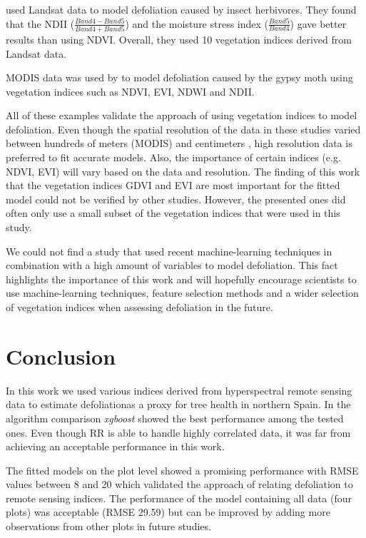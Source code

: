 \documentclass[review]{elsarticle}
\begin{document}
\cite{townsendGeneralLandsatModel2012} used Landsat data to model defoliation caused by insect herbivores.
They found that the \ac{NDII} ($\frac{Band 4 - Band 5}{Band 4 + Band 5}$) and the moisture stress index ($\frac{Band 5}{Band 4}$) gave better results than using NDVI.
Overall, they used 10 vegetation indices derived from Landsat data.

MODIS data was used by \cite{debeursEstimatingEffectGypsy2008} to model defoliation caused by the gypsy moth using vegetation indices such as NDVI, EVI, NDWI and NDII.

All of these examples validate the approach of using vegetation indices to model defoliation.
Even though the spatial resolution of the data in these studies varied between hundreds of meters (MODIS) \cite{debeursEstimatingEffectGypsy2008} and centimeters \cite{goodbodyDigitalAerialPhotogrammetry2018}, high resolution data is preferred to fit accurate models.
Also, the importance of certain indices (e.g. NDVI, EVI) will vary based on the data and resolution.
The finding of this work that the vegetation indices GDVI and EVI are most important for the fitted model could not be verified by other studies.
However, the presented ones did often only use a small subset of the vegetation indices that were used in this study.

We could not find a study that used recent machine-learning techniques in combination with a high amount of variables to model defoliation.
This fact highlights the importance of this work and will hopefully encourage scientists to use machine-learning techniques, feature selection methods and a wider selection of vegetation indices when assessing defoliation in the future.

\section{Conclusion}

\noindent In this work we used various indices derived from hyperspectral remote sensing data to estimate defoliationas a proxy for tree health in northern Spain.
In the algorithm comparison \textit{xgboost} showed the best performance among the tested ones.
Even though \ac{RR} is able to handle highly correlated data, it was far from achieving an acceptable performance in this work.

The fitted models on the plot level showed a promising performance with RMSE values between 8 and 20 which validated the approach of relating defoliation to remote sensing indices.
The performance of the model containing all data (four plots) was acceptable (RMSE 29.59) but can be improved by adding more observations from other plots in future studies.
\end{document}
